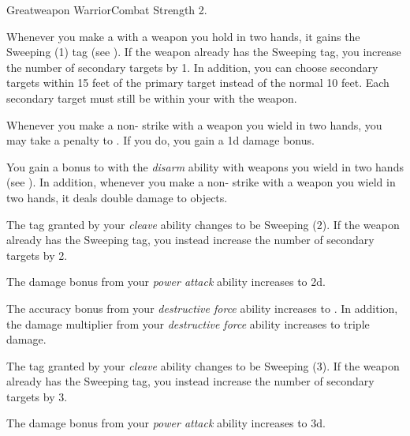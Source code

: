     \begin{feat}{Greatweapon Warrior}{Combat}
        \featpre Strength 2.

         Whenever you make a   with a weapon you hold in two hands, it gains the Sweeping (1) tag (see ).
        If the weapon already has the Sweeping tag, you increase the number of secondary targets by 1.
        In addition, you can choose secondary targets within 15 feet of the primary target instead of the normal 10 feet.
        Each secondary target must still be within your  with the weapon.

         Whenever you make a non- strike with a weapon you wield in two hands, you may take a  penalty to .
        If you do, you gain a \plus1d damage bonus.

         You gain a  bonus to  with the \textit{disarm} ability with weapons you wield in two hands (see ).
        In addition, whenever you make a non- strike with a weapon you wield in two hands, it deals double damage to objects.

         The tag granted by your \textit{cleave} ability changes to be Sweeping (2).
        If the weapon already has the Sweeping tag, you instead increase the number of secondary targets by 2.

         The damage bonus from your \textit{power attack} ability increases to \plus2d.

         The accuracy bonus from your \textit{destructive force} ability increases to .
        In addition, the damage multiplier from your \textit{destructive force} ability increases to triple damage.

         The tag granted by your \textit{cleave} ability changes to be Sweeping (3).
        If the weapon already has the Sweeping tag, you instead increase the number of secondary targets by 3.

         The damage bonus from your \textit{power attack} ability increases to \plus3d.
    \end{feat}

